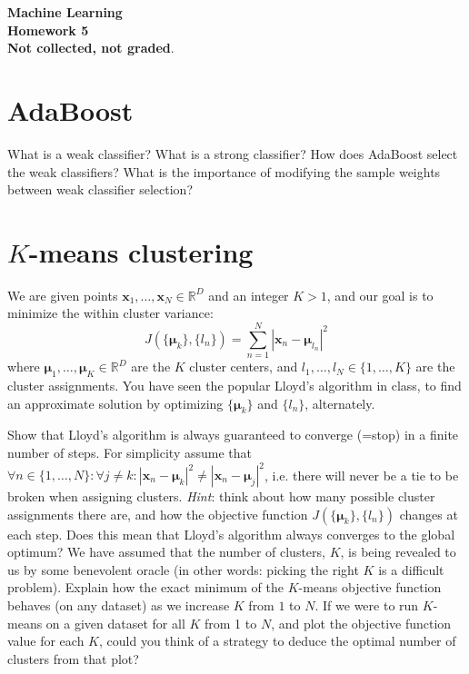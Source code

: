 \documentclass[11pt,noanswers,addpoints]{exam}
\renewcommand{\boldsymbol}[1]{\pmb{#1}}
\newcommand{\R}{\mathbb R}
\newcommand{\x}{\mathbf x}
\begin{document}
{\Large{\textbf{Machine Learning}}} \\[2mm]
\textbf{\Huge{Homework 5}}\\[2mm]


\textbf{Not collected, not graded}.




\section{AdaBoost}
\begin{questions}
\question What is a weak classifier?
\question What is a strong classifier?
\question How does AdaBoost select the weak classifiers? 
\question What is the importance of modifying the sample weights between weak classifier selection?
\end{questions}


\section{$K$-means clustering}
We are given points $\x_1,\ldots,\x_N\in\R^D$ and an integer $K>1$, and our goal is to minimize the within cluster variance:
$$J(\{\boldsymbol\mu_k\},\{l_n\})=\sum_{n=1}^N |\x_n - \boldsymbol\mu_{l_n}|^2$$
where $\boldsymbol\mu_1,\ldots,\boldsymbol\mu_K\in\R^D$ are the $K$ cluster centers, and $l_1,\ldots,l_N\in\{1,\ldots,K\}$ are the cluster assignments. You have seen the popular Lloyd's algorithm in class, to find an approximate solution by optimizing $\{\boldsymbol\mu_k\}$ and $\{l_n\}$, alternately.
\begin{questions}
\question Show that Lloyd's algorithm is always guaranteed to converge (=stop) in a finite number of steps. For simplicity assume that $\forall n\in\{1,\ldots,N\}\colon \forall j\neq k\colon |\x_n-\boldsymbol\mu_k|^2 \neq |\x_n-\boldsymbol\mu_j|^2$, i.e. there will never be a tie to be broken when assigning clusters.
\emph{Hint}: think about how many possible cluster assignments there are, and how the objective function $J(\{\boldsymbol\mu_k\},\{l_n\})$ changes at each step.
\question Does this mean that Lloyd's algorithm always converges to the global optimum?
\question We have assumed that the number of clusters, $K$, is being revealed to us by some benevolent oracle (in other words: picking the right $K$ is a difficult problem). Explain how the exact minimum of the $K$-means objective function behaves (on any dataset) as we increase $K$ from $1$ to $N$.
\question If we were to run $K$-means on a given dataset for all $K$ from 1 to $N$, and plot the objective function value for each $K$, could you think of a strategy to deduce the optimal number of clusters from that plot?
\end{questions}
\end{document}
